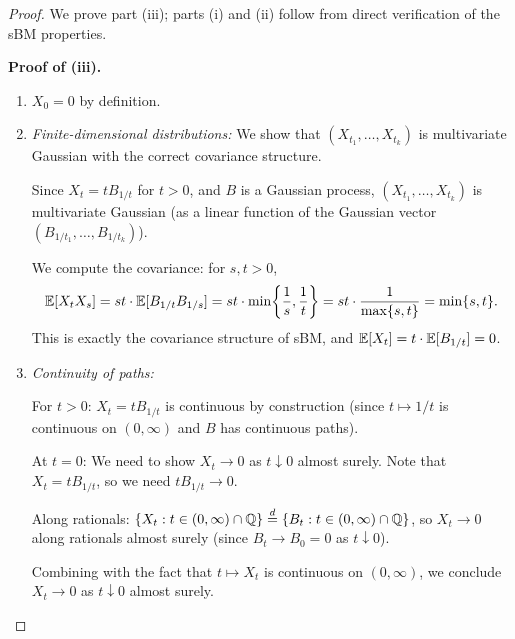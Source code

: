 \begin{proof}
    We prove part (iii); parts (i) and (ii) follow from direct verification of the sBM properties.

    \medskip
    \textbf{Proof of (iii).}

    \begin{enumerate}[label=(\alph*)]
        \item $X_0 = 0$ by definition.

        \item \emph{Finite-dimensional distributions:} We show that $(X_{t_1}, \ldots, X_{t_k})$ is multivariate Gaussian with the correct covariance structure.

        Since $X_t = t B_{1/t}$ for $t > 0$, and $B$ is a Gaussian process, $(X_{t_1}, \ldots, X_{t_k})$ is multivariate Gaussian (as a linear function of the Gaussian vector $(B_{1/t_1}, \ldots, B_{1/t_k})$).

        We compute the covariance: for $s, t > 0$,
        \[
            \mathbb{E}[X_t X_s] = st \cdot \mathbb{E}[B_{1/t} B_{1/s}]
            = st \cdot \min\!\left\{\frac{1}{s}, \frac{1}{t}\right\}
            = st \cdot \frac{1}{\max\{s,t\}}
            = \min\{s, t\}.
        \]
        This is exactly the covariance structure of sBM, and $\mathbb{E}[X_t] = t \cdot \mathbb{E}[B_{1/t}] = 0$.

        \item \emph{Continuity of paths:}

        For $t > 0$: $X_t = t B_{1/t}$ is continuous by construction (since $t \mapsto 1/t$ is continuous on $(0,\infty)$ and $B$ has continuous paths).

        At $t = 0$: We need to show $X_t \to 0$ as $t \downarrow 0$ almost surely. Note that $X_t = t B_{1/t}$, so we need $t B_{1/t} \to 0$.

        Along rationals: $\{X_t : t \in (0,\infty) \cap \mathbb{Q}\} \stackrel{d}{=} \{B_t : t \in (0,\infty) \cap \mathbb{Q}\}$, so $X_t \to 0$ along rationals almost surely (since $B_t \to B_0 = 0$ as $t \downarrow 0$).

        Combining with the fact that $t \mapsto X_t$ is continuous on $(0,\infty)$, we conclude $X_t \to 0$ as $t \downarrow 0$ almost surely. \qedhere
    \end{enumerate}
\end{proof}
